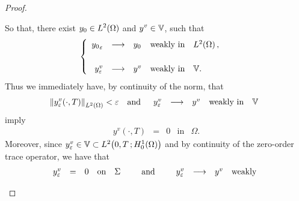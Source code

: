 \begin{proof}
\begin{enumerate}
            So that, there exist $\displaystyle y_{0}\in L^{2}\!\left({\Omega}\right)$
            and $\displaystyle y^{v}\in \mathbb{V}$, such that
            \begin{equation*}\label{eq:proof-thm-controllability-44}
                \begin{cases}\displaystyle
                    \begin{array}{rclll}
                        {y_{0}}_{\varepsilon} & \longrightarrow & y_{0} &
                        \text{weakly in} & L^{2}\!\left({\Omega}\right),\\
                        \\
                        y_{\varepsilon}^{v} & \longrightarrow & y^{v} &
                        \text{weakly in} & \mathbb{V}.
                    \end{array}
                \end{cases}
            \end{equation*}
            Thus we immediately have, by continuity of the norm, that
            \begin{equation*}\label{eq:proof-thm-controllability-45}
                {\left\|{y_{\varepsilon}^{v}\!\left({\cdot,T}\right) }\right\|}_{L^{2}\left({\Omega}\right)} < \varepsilon
                \quad\text{and}\quad
                \begin{array}{rclll}
                    y_{\varepsilon}^{v} & \longrightarrow & y^{v} & \text{weakly
                    in} & \mathbb{V}
                \end{array}
            \end{equation*}
            imply
            \begin{equation}\label{eq:proof-thm-controllability-46}
                \begin{array}{rclll}
                    y^{v}\!\left({\cdot, T}\right) & = & 0 & \text{in} &
                    \Omega.
                \end{array}
            \end{equation}
            Moreover, since $y_{\varepsilon}^{v}\in\mathbb{V}\subset
            L^{2}\!\left({0,T\,;H_{0}^{1}(\Omega)}\right)$ and by continuity of the
            zero-order trace operator, we have that
            \begin{equation*}
                \begin{array}{rclll}
                    y_{\varepsilon}^{v} & = & 0 & \text{on} & \Sigma
                \end{array}
                \qquad\text{and}\qquad
                \begin{array}{rclll}
                    y_{\varepsilon}^{v} & \longrightarrow & y^{v} & \text{weakly
}
\end{array}
\end{equation*}
\end{enumerate}
\end{proof}
